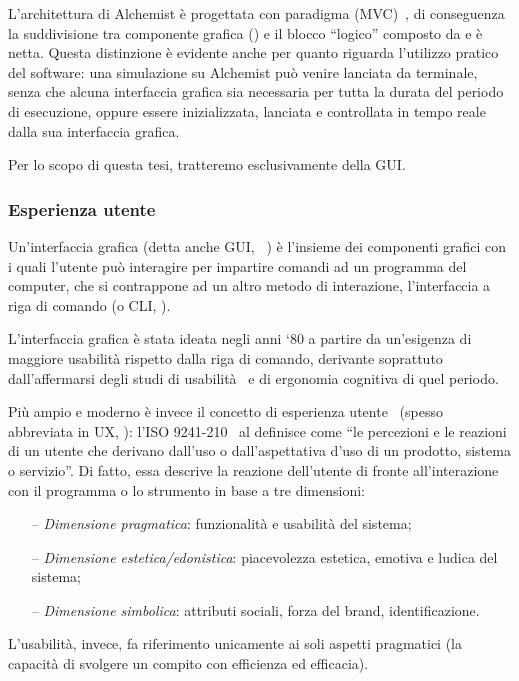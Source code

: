             L'architettura di Alchemist è progettata con paradigma  (MVC)~\cite{mvc}, di conseguenza la suddivisione tra componente grafica () e il blocco ``logico'' composto da  e  è netta.
            Questa distinzione è evidente anche per quanto riguarda l'utilizzo pratico del software: una simulazione su Alchemist può venire lanciata da terminale, senza che alcuna interfaccia grafica sia necessaria per tutta la durata del periodo di esecuzione, oppure essere inizializzata, lanciata e controllata in tempo reale dalla sua interfaccia grafica.

            Per lo scopo di questa tesi, tratteremo esclusivamente della GUI.

            \subsubsection{Esperienza utente}\label{subsub:prevUx}

            Un'interfaccia grafica (detta anche GUI, ~\cite{gui}) è l’insieme dei componenti grafici con i quali l'utente può interagire per impartire comandi ad un programma del computer, che si contrappone ad un altro metodo di interazione, l'interfaccia a riga di comando (o CLI, ).

            L'interfaccia grafica è stata ideata negli anni `80 a partire da un'esigenza di maggiore usabilità rispetto dalla riga di comando, derivante soprattuto dall'affermarsi degli studi di usabilità~\cite{norman1988} e di ergonomia cognitiva di quel periodo.

            Più ampio e moderno è invece il concetto di esperienza utente~\cite{ux} (spesso abbreviata in UX, ): l'ISO 9241-210~\cite{iso9421} al definisce come ``le percezioni e le reazioni di un utente che derivano dall’uso o dall’aspettativa d’uso di un prodotto, sistema o servizio''.
            Di fatto, essa descrive la reazione dell'utente di fronte all'interazione con il programma o lo strumento in base a tre dimensioni:
            \begin{itemize}
                \item[--] \emph{Dimensione pragmatica}: funzionalità e usabilità del sistema;
                \item[--] \emph{Dimensione estetica/edonistica}: piacevolezza estetica, emotiva e ludica del sistema;
                \item[--] \emph{Dimensione simbolica}: attributi sociali, forza del brand, identificazione.
            \end{itemize}
            L'usabilità, invece, fa riferimento unicamente ai soli aspetti pragmatici (la capacità di svolgere un compito con efficienza ed efficacia).

